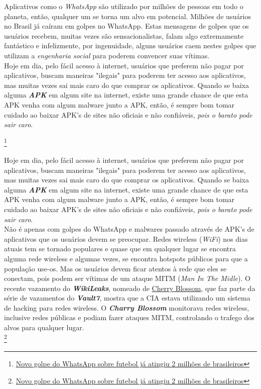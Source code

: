 \documentclass[12pt, letterpaper]{report}
\begin{document}
	Aplicativos como o \textit{WhatsApp} são utilizado por milhões de pessoas em todo o planeta, então, qualquer um se torna um alvo em potencial. Milhões de usuários no Brasil já caíram em golpes no WhatsApp. Estas mensagens de golpes que os usuários recebem, muitas vezes são sensacionalistas, falam algo extremamente fantástico e infelizmente, por ingenuidade, alguns usuários caem nestes golpes que utilizam a \textit{engenharia social} para poderem convencer suas vítimas.\\

	Hoje em dia, pelo fácil acesso à internet, usuários que preferem não pagar por aplicativos, buscam maneiras "ilegais" para poderem ter acesso aos aplicativos, mas muitas vezes sai mais caro do que comprar os aplicativos. Quando se baixa alguma \textbf{\textit{APK}} em algum site na internet, existe uma grande chance de que esta APK venha com algum malware junto a APK, então, é sempre bom tomar cuidado ao baixar APK's de sites não oficiais e não confiáveis, \textit{pois o barato pode sair caro}.


\footnote{\href{https://www.tecmundo.com.br/whatsapp/116247-novo-golpe-whatsapp-futebol-atingiu-2-milhoes-brasileiros.htm}{Novo golpe do WhatsApp sobre futebol já atingiu 2 milhões de brasileiros}}

	Hoje em dia, pelo fácil acesso à internet, usuários que preferem não pagar por aplicativos, buscam maneiras "ilegais" para poderem ter acesso aos aplicativos, mas muitas vezes sai mais caro do que comprar os aplicativos. Quando se baixa alguma \textbf{\textit{APK}} em algum site na internet, existe uma grande chance de que esta APK venha com algum malware junto a APK, então, é sempre bom tomar cuidado ao baixar APK's de sites não oficiais e não confiáveis, \textit{pois o barato pode sair caro}.\\

	Não é apenas com golpes do WhatsApp e malwares passado através de APK's de aplicativos que os usuários devem se preocupar. Redes wireless (\textit{WiFi}) nos dias atuais tem se tornado populares e quase que em qualquer lugar se encontra alguma rede wireless e algumas vezes, se encontra hotspots públicos para que a população use-os. Mas os usuários devem ficar atentos à rede que eles se conectam, pois podem ser vítimas de um ataque MITM (\textit{Man In The Midle}). O recente vazamento do \textbf{\textit{WikiLeaks}}, nomeado de \href{https://wikileaks.org/vault7/#Cherry\%20Blossom}{Cherry Blossom}, que faz parte da série de vazamentos do \textit{\textbf{Vault7}}, mostra que a CIA estava utilizando um sistema de hacking para redes wireless. O \textbf{\textit{Charry Blossom}} monitorava redes wireless, inclusive redes públicas e podiam fazer ataques MITM, controlando o trafego dos alvos para qualquer lugar.\\


\footnote{\href{https://www.tecmundo.com.br/whatsapp/116247-novo-golpe-whatsapp-futebol-atingiu-2-milhoes-brasileiros.htm}{Novo golpe do WhatsApp sobre futebol já atingiu 2 milhões de brasileiros}}
\end{document}
